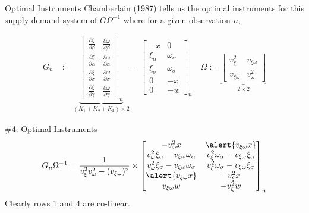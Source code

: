 \documentclass[xcolor=pdftex,dvipsnames,table,mathserif,aspectratio=169]{beamer}
\newcommand{\del}{\partial}
\begin{document}
\begin{frame}{Optimal Instruments}
\noindent Chamberlain (1987) tells us the optimal instruments for this supply-demand system of $G\Omega^{-1}$ where for a given observation $n$, 

\begin{align*}
G_n &:= \underbrace{\begin{bmatrix}
\frac{\del \xi}{\del \beta} & \frac{\del \omega}{\del \beta} \\
\frac{\del \xi}{\del \alpha} & \frac{\del \omega}{\del \alpha} \\
\frac{\del \xi}{\del \sigma} & \frac{\del \omega}{\del \sigma} \\
\frac{\del \xi}{\del \gamma} & \frac{\del \omega}{\del \gamma} 
\end{bmatrix}_n}_{(K_1 + K_2 + K_3)\times 2}
= \begin{bmatrix}
-x & 0 \\
\xi_\alpha & \omega_\alpha \\
\xi_\sigma & \omega_\sigma \\
0 & -x \\
0 & -w
\end{bmatrix}_n 
\quad  
\Omega := \underbrace{\begin{bmatrix}
v_\xi^2 & v_{\xi \omega} \\
v_{\xi \omega} & v_\omega^2
\end{bmatrix}}_{2 \times 2}
\end{align*}
\end{frame}


\begin{frame}{\#4: Optimal Instruments}
\begin{align*}
G_n\Omega^{-1} = \frac{1}{v_\xi^2 v_\omega^2 - (v_{\xi \omega})^2}\times \begin{bmatrix}
-v_\omega^2 x & \alert{v_{\xi \omega}x} \\
v_\omega^2 \xi_\alpha - v_{\xi \omega}\omega_\alpha & v_\xi^2 \omega_\alpha - v_{\xi \omega}\xi_\alpha \\
v_\omega^2 \xi_\sigma - v_{\xi \omega}\omega_\sigma & v_\xi^2 \omega_\sigma - v_{\xi \omega}\xi_\sigma \\
\alert{v_{\xi \omega}x }&  -v_\xi^2 x \\
v_{\xi \omega}w & -v_\xi^2 w
\end{bmatrix}_n
\end{align*}
\noindent Clearly rows 1 and 4 are co-linear. 
\end{frame}
\end{document}
